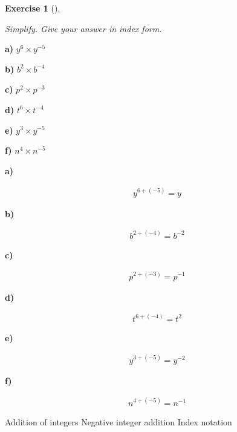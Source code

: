 \documentclass[
  letterpaper,
  DIV=11,
  numbers=noendperiod]{scrreprt}
\theoremstyle{definition}
\newtheorem{exercise}{Exercise}[chapter]
\theoremstyle{remark}
\begin{document}
\begin{exercise}[]\protect\hypertarget{exr-u2-15}{}\label{exr-u2-15}

\emph{Simplify. Give your answer in index form.}

\textbf{a)} \(\displaystyle y^{6} \times y^{-5}\)

\textbf{b)} \(\displaystyle b^{2} \times b^{-4}\)

\textbf{c)} \(\displaystyle p^{2} \times p^{-3}\)

\textbf{d)} \(\displaystyle t^{6} \times t^{-4}\)

\textbf{e)} \(\displaystyle y^{3} \times y^{-5}\)

\textbf{f)} \(\displaystyle n^{4} \times n^{-5}\)

\begin{tcolorbox}[enhanced jigsaw, opacitybacktitle=0.6, coltitle=black, arc=.35mm, colframe=quarto-callout-tip-color-frame, colback=white, bottomrule=.15mm, left=2mm, colbacktitle=quarto-callout-tip-color!10!white, titlerule=0mm, opacityback=0, title=\textcolor{quarto-callout-tip-color}{\faLightbulb}\hspace{0.5em}{🔍 View Solutions}, leftrule=.75mm, breakable, rightrule=.15mm, bottomtitle=1mm, toptitle=1mm, toprule=.15mm]

\textbf{a)}

\[
\begin{aligned}
y^{6+(-5)} = y
\end{aligned}
\]

\textbf{b)}

\[
\begin{aligned}
b^{2+(-4)} = b^{-2}
\end{aligned}
\]

\textbf{c)}

\[
\begin{aligned}
p^{2+(-3)} = p^{-1}
\end{aligned}
\]

\textbf{d)}

\[
\begin{aligned}
t^{6+(-4)} = t^{2}
\end{aligned}
\]

\textbf{e)}

\[
\begin{aligned}
y^{3+(-5)} = y^{-2}
\end{aligned}
\]

\textbf{f)}

\[
\begin{aligned}
n^{4+(-5)} = n^{-1}
\end{aligned}
\]

\end{tcolorbox}

{Addition of integers} {Negative integer addition} {Index notation}

\end{exercise}
\end{document}
